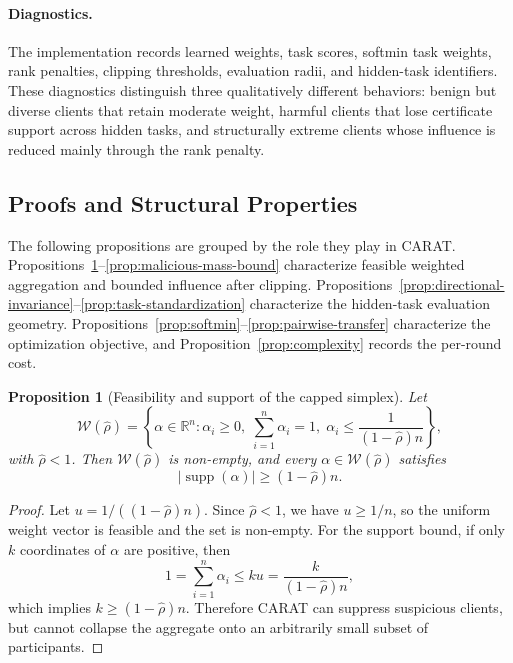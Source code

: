 \documentclass{article}
\newcommand{\R}{\mathbb{R}}
\newtheorem{proposition}{Proposition}[section]
\begin{document}
\paragraph{Diagnostics.}
The implementation records learned weights, task scores, softmin task weights, rank penalties, clipping thresholds, evaluation radii, and hidden-task identifiers. These diagnostics distinguish three qualitatively different behaviors: benign but diverse clients that retain moderate weight, harmful clients that lose certificate support across hidden tasks, and structurally extreme clients whose influence is reduced mainly through the rank penalty.

\subsection{Proofs and Structural Properties}
\label{sec:appendix-theory}

The following propositions are grouped by the role they play in CARAT. Propositions~\ref{prop:capped-simplex}--\ref{prop:malicious-mass-bound} characterize feasible weighted aggregation and bounded influence after clipping. Propositions~\ref{prop:directional-invariance}--\ref{prop:task-standardization} characterize the hidden-task evaluation geometry. Propositions~\ref{prop:softmin}--\ref{prop:pairwise-transfer} characterize the optimization objective, and Proposition~\ref{prop:complexity} records the per-round cost.

\begin{proposition}[Feasibility and support of the capped simplex]
\label{prop:capped-simplex}
Let
\[
\mathcal{W}(\hat{\rho})=
\left\{
\alpha \in \R^n:
\alpha_i \ge 0,\;
\sum_{i=1}^n \alpha_i = 1,\;
\alpha_i \le \frac{1}{(1-\hat{\rho})n}
\right\},
\]
with $\hat{\rho}<1$. Then $\mathcal{W}(\hat{\rho})$ is non-empty, and every $\alpha \in \mathcal{W}(\hat{\rho})$ satisfies
\[
|\operatorname{supp}(\alpha)| \ge (1-\hat{\rho})n.
\]
\end{proposition}

\begin{proof}
Let $u = 1/((1-\hat{\rho})n)$. Since $\hat{\rho}<1$, we have $u \ge 1/n$, so the uniform weight vector is feasible and the set is non-empty. For the support bound, if only $k$ coordinates of $\alpha$ are positive, then
\[
1=\sum_{i=1}^n \alpha_i \le k u = \frac{k}{(1-\hat{\rho})n},
\]
which implies $k \ge (1-\hat{\rho})n$. Therefore CARAT can suppress suspicious clients, but cannot collapse the aggregate onto an arbitrarily small subset of participants.
\end{proof}
\end{document}
